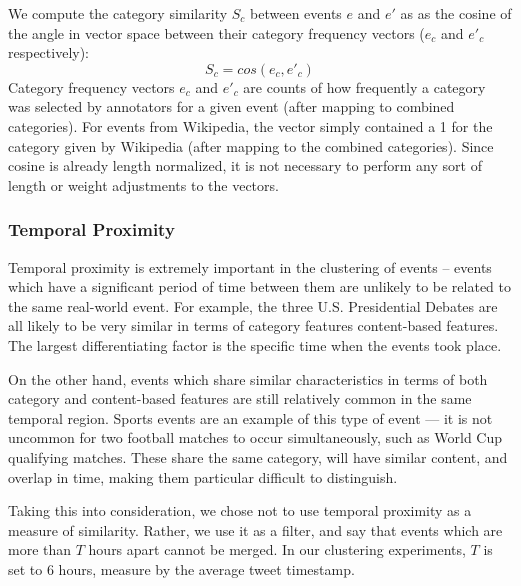 We compute the category similarity $S_c$ between events $e$ and $e'$ as as the cosine of the angle in vector space between their category frequency vectors ($e_c$ and $e'_c$ respectively):
\begin{displaymath}
	S_c = cos(e_c, e'_c)
\end{displaymath}
Category frequency vectors $e_c$ and $e'_c$ are counts of how frequently a category was selected by annotators for a given event (after mapping to combined categories). For events from Wikipedia, the vector simply contained a 1 for the category given by Wikipedia (after mapping to the combined categories).
Since cosine is already length normalized, it is not necessary to perform any sort of length or weight adjustments to the vectors.

\subsubsection{Temporal Proximity}
Temporal proximity is extremely important in the clustering of events -- events which have a significant period of time between them are unlikely to be related to the same real-world event.
For example, the three U.S. Presidential Debates are all likely to be very similar in terms of category features content-based features.
The largest differentiating factor is the specific time when the events took place.

On the other hand, events which share similar characteristics in terms of both category and content-based features are still relatively common in the same temporal region.
Sports events are an example of this type of event --- it is not uncommon for two football matches to occur simultaneously, such as World Cup qualifying matches.
These share the same category, will have similar content, and overlap in time, making them particular difficult to distinguish.

Taking this into consideration, we chose not to use temporal proximity as a measure of similarity.
Rather, we use it as a filter, and say that events which are more than $T$ hours apart cannot be merged.
In our clustering experiments, $T$ is set to 6 hours, measure by the average tweet timestamp.

